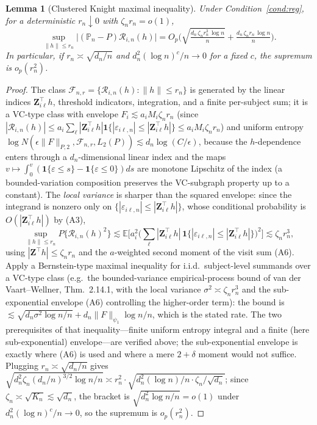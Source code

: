 \documentclass[11pt]{article}
\newtheorem{lemma}{Lemma}
\theoremstyle{remark}\newtheorem{remark}{Remark}
\newcommand{\E}{\mathbb{E}}
\newcommand{\Pn}{\mathbb{P}_n}
\newcommand{\Z}{\bm{Z}}
\newcommand{\indc}[1]{\mathbf{1}\{#1\}}
\begin{document}
\begin{lemma}[Clustered Knight maximal inequality]\label{lem:knight}
Under Condition~\ref{cond:reg}, for a deterministic $r_n\downarrow0$ with
$\zeta_n r_n=o(1)$,
\[
\sup_{\|h\|\le r_n}\big|(\Pn-P)\mathcal R_{i,n}(h)\big|
=O_p\!\Big(\sqrt{\tfrac{d_n\,\zeta_n r_n^3\,\log n}{n}}
+\tfrac{d_n\,\zeta_n r_n\,\log n}{n}\Big).
\]
In particular, if $r_n\asymp\sqrt{d_n/n}$ and $d_n^2(\log n)^c/n\to0$ for a
fixed $c$, the supremum is $o_p(r_n^2)$.
\end{lemma}
\begin{proof}
The class $\mathcal F_{n,r}=\{\mathcal R_{i,n}(h):\|h\|\le r_n\}$ is generated by
the linear indices $\Z_{i\ell}^\top h$, threshold indicators, integration, and a
finite per-subject sum; it is a VC-type class with envelope
$F_{i}\lesssim a_i M_i\zeta_n r_n$ (since $|\mathcal R_{i,n}(h)|\le a_i\sum_\ell
|\Z_{i\ell}^\top h|\indc{|\varepsilon_{i\ell,n}|\le|\Z_{i\ell}^\top h|}\le a_i M_i
\zeta_n r_n$) and uniform entropy
$\log N(\epsilon\|F\|_{P,2},\mathcal F_{n,r},L_2(P))\lesssim d_n\log(C/\epsilon)$,
because the $h$-dependence enters through a $d_n$-dimensional linear index and
the maps $v\mapsto\int_0^v(\indc{\varepsilon\le s}-\indc{\varepsilon\le0})ds$ are
monotone Lipschitz of the index (a bounded-variation composition preserves the
VC-subgraph property up to a constant). The \emph{local variance} is sharper
than the squared envelope: since the integrand is nonzero only on
$\{|\varepsilon_{i\ell,n}|\le|\Z_{i\ell}^\top h|\}$, whose conditional
probability is $O(|\Z_{i\ell}^\top h|)$ by (A3),
\[
\sup_{\|h\|\le r_n}P\{\mathcal R_{i,n}(h)^2\}
\lesssim\E\Big[a_i^2\Big(\sum_\ell|\Z_{i\ell}^\top h|\,
\indc{|\varepsilon_{i\ell,n}|\le|\Z_{i\ell}^\top h|}\Big)^2\Big]
\lesssim\zeta_n r_n^3,
\]
using $|\Z^\top h|\le\zeta_n r_n$ and the $a$-weighted second moment of the
visit sum (A6). Apply a Bernstein-type maximal inequality for i.i.d.\
subject-level summands over a VC-type class (e.g.\ the bounded-variance
empirical-process bound of van der Vaart--Wellner, Thm.\ 2.14.1, with the local
variance $\sigma^2\asymp\zeta_n r_n^3$ and the sub-exponential envelope (A6)
controlling the higher-order term): the bound is
$\lesssim\sqrt{d_n\sigma^2\log n/n}+d_n\|F\|_{\psi_1}\log n/n$, which is the
stated rate. The two prerequisites of that inequality---finite uniform entropy
integral and a finite (here sub-exponential) envelope---are verified above; the
sub-exponential envelope is exactly where (A6) is used and where a mere
$2{+}\delta$ moment would not suffice. Plugging $r_n\asymp\sqrt{d_n/n}$ gives
$\sqrt{d_n^2\zeta_n(d_n/n)^{3/2}\log n/n}\asymp r_n^2\cdot
\sqrt{d_n^2(\log n)/n\cdot\zeta_n/\sqrt{d_n}}$; since $\zeta_n\asymp\sqrt{K_n}
\lesssim\sqrt{d_n}$, the bracket is $\sqrt{d_n^2\log n/n}=o(1)$ under
$d_n^2(\log n)^c/n\to0$, so the supremum is $o_p(r_n^2)$.
\end{proof}
\end{document}

